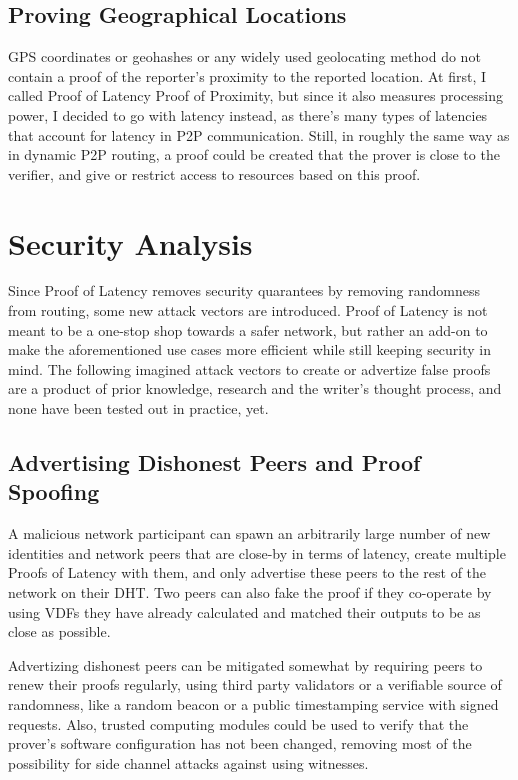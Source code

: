 \subsection{Proving Geographical Locations}
GPS coordinates or geohashes or any widely used geolocating method do not contain a proof of the reporter's proximity to the reported location. At first, I called Proof of Latency Proof of Proximity, but since it also measures processing power, I decided to go with latency instead, as there's many types of latencies that account for latency in P2P communication. Still, in roughly the same way as in dynamic P2P routing, a proof could be created that the prover is close to the verifier, and give or restrict access to resources based on this proof.

\section{Security Analysis}
Since Proof of Latency removes security quarantees by removing randomness from routing, some new attack vectors are introduced. Proof of Latency is not meant to be a one-stop shop towards a safer network, but rather an add-on to make the aforementioned use cases more efficient while still keeping security in mind. The following imagined attack vectors to create or advertize false proofs are a product of prior knowledge, research and the writer's thought process, and none have been tested out in practice, yet.

\subsection{Advertising Dishonest Peers and Proof Spoofing}
A malicious network participant can spawn an arbitrarily large number of new identities and network peers that are close-by in terms of latency, create multiple Proofs of Latency with them, and only advertise these peers to the rest of the network on their DHT. Two peers can also fake the proof if they co-operate by using VDFs they have already calculated and matched their outputs to be as close as possible.

Advertizing dishonest peers can be mitigated somewhat by requiring peers to renew their proofs regularly, using third party validators or a verifiable source of randomness, like a random beacon or a public timestamping service with signed requests. Also, trusted computing modules could be used to verify that the prover's software configuration has not been changed, removing most of the possibility for side channel attacks against using witnesses.


